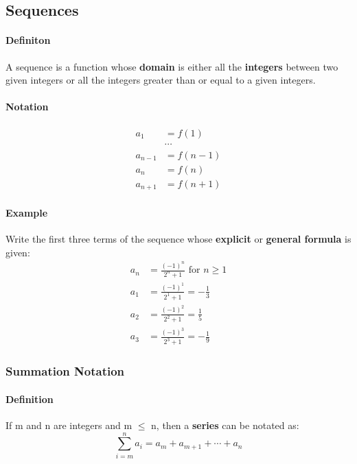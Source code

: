 \subsection{Sequences}
\hrulefill

\paragraph*{Definiton}
A sequence is a function whose \textbf{domain} is either all the \textbf{integers} between two given integers 
or all the integers greater than or equal to a given integers.

\paragraph*{Notation}
\begin{align*}
    a_1 &= f(1)\\
    &\cdots\\
    a_{n-1} &= f(n-1)\\
    a_n &= f(n)\\
    a_{n+1} &= f(n+1)
\end{align*}

\paragraph*{Example}
Write the first three terms of the sequence whose \textbf{explicit} or \textbf{general formula} is given:
\begin{align*}
    a_n &= \frac{(-1)^n}{2^n + 1} \text{ for } n \geq 1\\
    a_1 &= \frac{(-1)^1}{2^1 + 1} = - \frac{1}{3}\\
    a_2 &= \frac{(-1)^2}{2^2 + 1} = \frac{1}{5}\\
    a_3 &= \frac{(-1)^3}{2^3 + 1} = - \frac{1}{9}
\end{align*}

\subsubsection*{Summation Notation}
\paragraph*{Definition}
If m and n are integers and m $\leq$ n, then a \textbf{series} can be notated as:
\begin{equation*}
    \sum_{i=m}^n a_i = a_m + a_{m+1} + \cdots + a_n
\end{equation*} 

